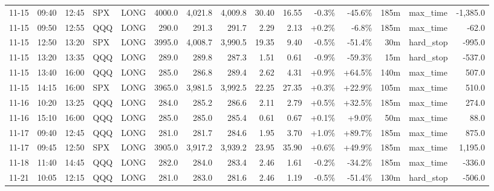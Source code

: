 \documentclass[11pt,a4paper,twoside]{article}
\begin{document}
\begin{landscape}
\begin{center}
\begin{longtable}{>{\color{txtmain}}l l l l l r r r r r r r r >{\color{txtmain}}l r}
11-15 & 09:40 & 12:45 & SPX & LONG & 4000.0 & 4,021.8 & 4,009.8 & 30.40 & 16.55 & \textcolor{lossred}{-0.3\%} & \textcolor{lossred}{-45.6\%} & 185m & max\_time & \textcolor{lossred}{-1,385.0} \\
11-15 & 09:50 & 12:55 & QQQ & LONG & 290.0 & 291.3 & 291.7 & 2.29 & 2.13 & \textcolor{wingreen}{+0.2\%} & \textcolor{lossred}{-6.8\%} & 185m & max\_time & \textcolor{lossred}{-62.0} \\
11-15 & 12:50 & 13:20 & SPX & LONG & 3995.0 & 4,008.7 & 3,990.5 & 19.35 & 9.40 & \textcolor{lossred}{-0.5\%} & \textcolor{lossred}{-51.4\%} & 30m & hard\_stop & \textcolor{lossred}{-995.0} \\
11-15 & 13:20 & 13:35 & QQQ & LONG & 289.0 & 289.8 & 287.3 & 1.51 & 0.61 & \textcolor{lossred}{-0.9\%} & \textcolor{lossred}{-59.3\%} & 15m & hard\_stop & \textcolor{lossred}{-537.0} \\
11-15 & 13:40 & 16:00 & QQQ & LONG & 285.0 & 286.8 & 289.4 & 2.62 & 4.31 & \textcolor{wingreen}{+0.9\%} & \textcolor{wingreen}{+64.5\%} & 140m & max\_time & \textcolor{wingreen}{507.0} \\
11-15 & 14:15 & 16:00 & SPX & LONG & 3965.0 & 3,981.5 & 3,992.5 & 22.25 & 27.35 & \textcolor{wingreen}{+0.3\%} & \textcolor{wingreen}{+22.9\%} & 105m & max\_time & \textcolor{wingreen}{510.0} \\
11-16 & 10:20 & 13:25 & QQQ & LONG & 284.0 & 285.2 & 286.6 & 2.11 & 2.79 & \textcolor{wingreen}{+0.5\%} & \textcolor{wingreen}{+32.5\%} & 185m & max\_time & \textcolor{wingreen}{274.0} \\
11-16 & 15:10 & 16:00 & QQQ & LONG & 285.0 & 285.0 & 285.4 & 0.61 & 0.67 & \textcolor{wingreen}{+0.1\%} & \textcolor{wingreen}{+9.0\%} & 50m & max\_time & \textcolor{wingreen}{88.0} \\
11-17 & 09:40 & 12:45 & QQQ & LONG & 281.0 & 281.7 & 284.6 & 1.95 & 3.70 & \textcolor{wingreen}{+1.0\%} & \textcolor{wingreen}{+89.7\%} & 185m & max\_time & \textcolor{wingreen}{875.0} \\
11-17 & 09:45 & 12:50 & SPX & LONG & 3905.0 & 3,917.2 & 3,939.2 & 23.95 & 35.90 & \textcolor{wingreen}{+0.6\%} & \textcolor{wingreen}{+49.9\%} & 185m & max\_time & \textcolor{wingreen}{1,195.0} \\
11-18 & 11:40 & 14:45 & QQQ & LONG & 282.0 & 284.0 & 283.4 & 2.46 & 1.61 & \textcolor{lossred}{-0.2\%} & \textcolor{lossred}{-34.2\%} & 185m & max\_time & \textcolor{lossred}{-336.0} \\
11-21 & 10:05 & 12:15 & QQQ & LONG & 281.0 & 283.0 & 281.6 & 2.46 & 1.19 & \textcolor{lossred}{-0.5\%} & \textcolor{lossred}{-51.4\%} & 130m & hard\_stop & \textcolor{lossred}{-506.0} \\

\end{longtable}
\end{center}
\end{landscape}
\end{document}
